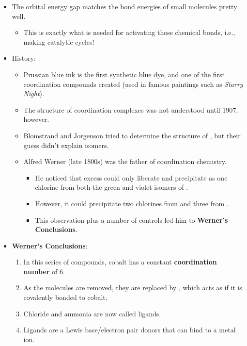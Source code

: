 \documentclass[../notes.tex]{subfiles}
\begin{document}
\begin{itemize}
    \item The orbital energy gap matches the bond energies of small molecules pretty well.
    \begin{itemize}
        \item This is exactly what is needed for activating those chemical bonds, i.e., making catalytic cycles!
    \end{itemize}
    \item History:
    \begin{itemize}
        \item Prussian blue ink is the first synthetic blue dye, and one of the first coordination compounds created (used in famous paintings such as \emph{Starry Night}).
        \item The structure of coordination complexes was not understood until 1907, however.
        \item Blomstrand and Jorgenson tried to determine the structure of , but their guess didn't explain isomers.
        \item Alfred Werner (late 1800s) was the father of coordination chemistry.
        \begin{itemize}
            \item He noticed that excess  could only liberate and precipitate as  one chlorine from both the green and violet isomers of .
            \item However, it could precipitate two chlorines from  and three from .
            \item This observation plus a number of controls led him to \textbf{Werner's Conclusions}.
        \end{itemize}
    \end{itemize}
    \item \textbf{Werner's Conclusions}:
    \begin{enumerate}
        \item In this series of compounds, cobalt has a constant \textbf{coordination number} of 6.
        \item As the  molecules are removed, they are replaced by , which acts as if it is covalently bonded to cobalt.
        \item Chloride and ammonia are now called ligands.
        \item Ligands are a Lewis base/electron pair donors that can bind to a metal ion.

\end{enumerate}
\end{itemize}
\end{document}
